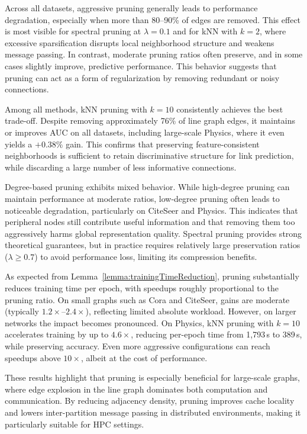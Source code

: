 \documentclass[pdflatex,sn-mathphys-num]{sn-jnl}%
\theoremstyle{thmstyleone}%
\theoremstyle{thmstyletwo}%
\theoremstyle{thmstylethree}%
\theoremstyle{plain} %
\theoremstyle{definition} %
\theoremstyle{remark} %
\theoremstyle{plain} %
\begin{document}
Across all datasets, aggressive pruning generally leads to performance degradation, especially when more than 80--90\% of edges are removed. 
This effect is most visible for spectral pruning at $\lambda=0.1$ and for kNN with $k=2$, where excessive sparsification disrupts local neighborhood structure and weakens message passing. 
In contrast, moderate pruning ratios often preserve, and in some cases slightly improve, predictive performance. 
This behavior suggests that pruning can act as a form of regularization by removing redundant or noisy connections.

Among all methods, kNN pruning with $k=10$ consistently achieves the best trade-off. 
Despite removing approximately 76\% of line graph edges, it maintains or improves AUC on all datasets, including large-scale Physics, where it even yields a $+0.38\%$ gain. 
This confirms that preserving feature-consistent neighborhoods is sufficient to retain discriminative structure for link prediction, while discarding a large number of less informative connections.

Degree-based pruning exhibits mixed behavior. 
While high-degree pruning can maintain performance at moderate ratios, low-degree pruning often leads to noticeable degradation, particularly on CiteSeer and Physics. 
This indicates that peripheral nodes still contribute useful information and that removing them too aggressively harms global representation quality. 
Spectral pruning provides strong theoretical guarantees, but in practice requires relatively large preservation ratios ($\lambda \geq 0.7$) to avoid performance loss, limiting its compression benefits.


As expected from Lemma~\ref{lemma:trainingTimeReduction}, pruning substantially reduces training time per epoch, with speedups roughly proportional to the pruning ratio. 
On small graphs such as Cora and CiteSeer, gains are moderate (typically $1.2\times$--$2.4\times$), reflecting limited absolute workload. 
However, on larger networks the impact becomes pronounced. On Physics, kNN pruning with $k=10$ accelerates training by up to $4.6\times$, reducing per-epoch time from 1,793\,s to 389\,s, while preserving accuracy. Even more aggressive configurations can reach speedups above $10\times$, albeit at the cost of performance.

These results highlight that pruning is especially beneficial for large-scale graphs, where edge explosion in the line graph dominates both computation and communication. 
By reducing adjacency density, pruning improves cache locality and lowers inter-partition message passing in distributed environments, making it particularly suitable for HPC settings.
\end{document}
